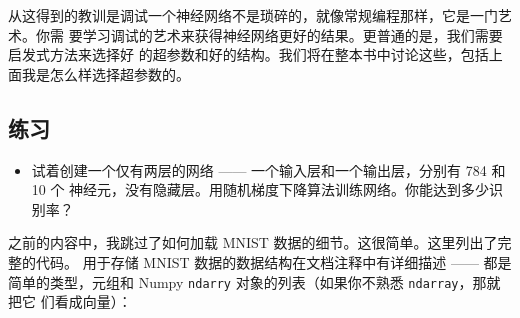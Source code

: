 从这得到的教训是调试一个神经网络不是琐碎的，就像常规编程那样，它是一门艺术。你需
要学习调试的艺术来获得神经网络更好的结果。更普通的是，我们需要启发式方法来选择好
的超参数和好的结构。我们将在整本书中讨论这些，包括上面我是怎么样选择超参数的。

\subsection*{练习}

\begin{itemize}
\item 试着创建一个仅有两层的网络 —— 一个输入层和一个输出层，分别有 784 和 10 个
  神经元，没有隐藏层。用随机梯度下降算法训练网络。你能达到多少识别率？
\end{itemize}

之前的内容中，我跳过了如何加载 MNIST 数据的细节。这很简单。这里列出了完整的代码。
用于存储 MNIST 数据的数据结构在文档注释中有详细描述 —— 都是简单的类型，元组和
Numpy \lstinline!ndarry! 对象的列表（如果你不熟悉 \lstinline!ndarray!，那就把它
  们看成向量）：

